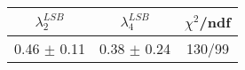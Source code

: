 \begin{tabular}{c|c||c}
$\lambda_{2}^{LSB}$ & $\lambda_4^{LSB}$ & $\chi^{2}$/ndf \\
\hline
0.46 $\pm$ 0.11 & 0.38 $\pm$ 0.24 & 130/99\\
\end{tabular}
